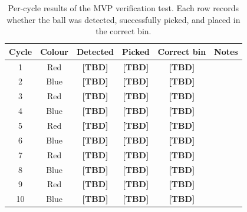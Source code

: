 \begin{table}[H]
    \centering
    \renewcommand{\arraystretch}{1.3}
    \begin{tabular}{|c|c|c|c|c|l|}
        \hline
        \textbf{Cycle} & \textbf{Colour} &
        \textbf{Detected} & \textbf{Picked} &
        \textbf{Correct bin} & \textbf{Notes} \\
        \hline
        1  & Red  & \textbf{[TBD]} & \textbf{[TBD]} &
        \textbf{[TBD]} & \\
        \hline
        2  & Blue & \textbf{[TBD]} & \textbf{[TBD]} &
        \textbf{[TBD]} & \\
        \hline
        3  & Red  & \textbf{[TBD]} & \textbf{[TBD]} &
        \textbf{[TBD]} & \\
        \hline
        4  & Blue & \textbf{[TBD]} & \textbf{[TBD]} &
        \textbf{[TBD]} & \\
        \hline
        5  & Red  & \textbf{[TBD]} & \textbf{[TBD]} &
        \textbf{[TBD]} & \\
        \hline
        6  & Blue & \textbf{[TBD]} & \textbf{[TBD]} &
        \textbf{[TBD]} & \\
        \hline
        7  & Red  & \textbf{[TBD]} & \textbf{[TBD]} &
        \textbf{[TBD]} & \\
        \hline
        8  & Blue & \textbf{[TBD]} & \textbf{[TBD]} &
        \textbf{[TBD]} & \\
        \hline
        9  & Red  & \textbf{[TBD]} & \textbf{[TBD]} &
        \textbf{[TBD]} & \\
        \hline
        10 & Blue & \textbf{[TBD]} & \textbf{[TBD]} &
        \textbf{[TBD]} & \\
        \hline
    \end{tabular}
    \caption{Per-cycle results of the MVP verification test.
    Each row records whether the ball was detected, successfully
    picked, and placed in the correct bin.}
\end{table}


